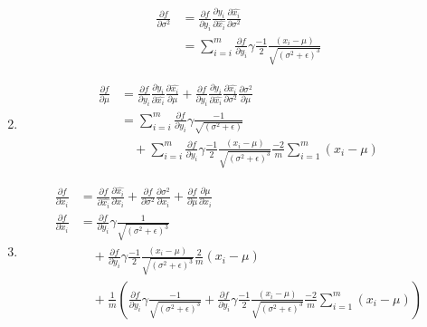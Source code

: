 \documentclass{article}
\begin{document}
\begin{enumerate}[label=\alph*.]
\begin{equation*}
\begin{aligned}
            \frac{\partial f}{\partial \sigma^2} &= \frac{\partial f}{\partial y_i} \frac{\partial y_i}{\partial \widehat{x_i}} \frac{\partial \widehat{x_i}}{\partial \sigma^2} \\
            &=  \sum_{i=i}^{m}\frac{\partial f}{\partial y_i} \gamma \frac{-1}{2} \frac{(x_i-\mu)}{\sqrt{(\sigma^2 + \epsilon)^3}}
        \end{aligned}
    \end{equation*}  
    \item 
    \begin{equation*}
        \begin{aligned}
            \frac{\partial f}{\partial \mu} &= \frac{\partial f}{\partial y_i} \frac{\partial y_i}{\partial \widehat{x_i}} \frac{\partial \widehat{x_i}}{\partial \mu} + \frac{\partial f}{\partial y_i} \frac{\partial y_i}{\partial \widehat{x_i}} \frac{\partial \widehat{x_i}}{\partial \sigma^2} \frac{\partial \sigma^2}{\partial \mu} \\
            &= \sum_{i=i}^{m}\frac{\partial f}{\partial y_i} \gamma \frac{-1}{\sqrt{(\sigma^2+\epsilon)}} \\
            &\quad+ \sum_{i=i}^{m}\frac{\partial f}{\partial y_i} \gamma \frac{-1}{2} \frac{(x_i-\mu)}{\sqrt{(\sigma^2 + \epsilon)^3}} \frac{-2}{m} \sum_{i=1}^{m}(x_i - \mu) 
        \end{aligned}
    \end{equation*}  
    \item
    \begin{equation*}
        \begin{aligned}
            \frac{\partial f}{\partial x_i} &= \frac{\partial f}{\partial \widehat{x_i}} \frac{\partial \widehat{x_i}}{\partial x_i} + \frac{\partial f}{\partial \sigma^2} \frac{\partial \sigma^2}{\partial x_i} + \frac{\partial f}{\partial \mu} \frac{\partial \mu}{\partial x_i} \\
            \frac{\partial f}{\partial x_i} &= \frac{\partial f}{\partial y_i} \gamma \frac{1}{\sqrt{(\sigma^2+\epsilon)^3}} \\
            &\quad+ \frac{\partial f}{\partial y_i} \gamma \frac{-1}{2} \frac{(x_i-\mu)}{\sqrt{(\sigma^2 + \epsilon)^3}} \frac{2}{m}(x_i-\mu) \\
            &\quad+ \frac{1}{m}(\frac{\partial f}{\partial y_i} \gamma \frac{-1}{\sqrt{(\sigma^2+\epsilon)^3}} + \frac{\partial f}{\partial y_i} \gamma \frac{-1}{2} \frac{(x_i-\mu)}{\sqrt{(\sigma^2 + \epsilon)^3}} \frac{-2}{m} \sum_{i=1}^{m}(x_i - \mu) )
        \end{aligned}
    \end{equation*}
\end{enumerate}
\end{document}
